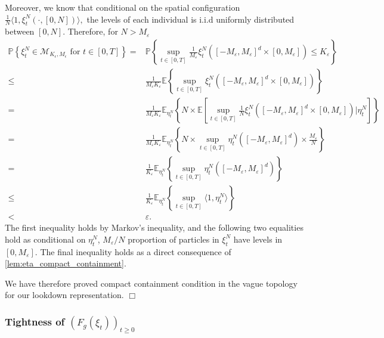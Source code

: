 \documentclass[12pt]{article}
\newenvironment {proof}{{\noindent\bf Proof }}{\hfill $\Box$ \medskip}
\begin{document}
\begin{proof}
Moreover, we know that conditional on the spatial configuration 
$\frac{1}{N}\langle 1, \xi^{N}_t(\cdot , [0, N]) \rangle,$
the levels of each individual
is i.i.d uniformly distributed between $[0,N]$. 
Therefore, for $N>M_{\varepsilon}$
\begin{align*}
     \mathbb{P}\left\{ \xi^{N}_t \in \mathcal{M}_{K_{\epsilon},M_{\epsilon}}
        \text{ for } t\in [0,T] \right\}
        =& \mathbb{P}\left\{\sup_{ t\in [0,T]} \frac{1}{M_\varepsilon} \xi^{N}_t([-M_\varepsilon,M_\varepsilon]^d \times [0,M_\varepsilon]) \leq K_\varepsilon
         \right\}\\
         \leq& \frac{1}{M_\varepsilon K_{\varepsilon}} \mathbb{E}\left\{\sup_{ t\in [0,T]}  \xi^{N}_t([-M_\varepsilon,M_\varepsilon]^d \times [0,M_\varepsilon]) \right\}\\
        =& \frac{1}{M_\varepsilon K_{\varepsilon}}             \mathbb{E}_{\eta^N_t}\left\{ N \times
            \mathbb{E}\left[  
                \sup_{ t\in [0,T]}  \frac{1}{N}\xi^{N}_t([-M_\varepsilon,M_\varepsilon]^d \times [0,M_\varepsilon])
                \bigg| \eta^N_t
                        \right]
                    \right\}\\
        =& \frac{1}{M_\varepsilon K_{\varepsilon}} \mathbb{E}_{\eta^N_t}
                    \left\{ N \times
                    \sup_{ t\in [0,T]} \eta^{N}_t([-M_\varepsilon,M_\varepsilon]^d) \times \frac{M_{\varepsilon}}{N}
                    \right\}\\
        =& \frac{1}{K_{\varepsilon}} \mathbb{E}_{\eta^N_t}
                    \left\{
                    \sup_{ t\in [0,T]} \eta^{N}_t([-M_\varepsilon,M_\varepsilon]^d) 
                    \right\}\\
        \leq & \frac{1}{K_{\varepsilon}} \mathbb{E}_{\eta^N_t}
                    \left\{
                    \sup_{ t\in [0,T]} \langle 1, \eta^{N}_t \rangle 
                    \right\}\\
        < & \varepsilon.
\end{align*}
The first inequality holds by Markov's inequality, and the following two equalities hold as 
conditional on $\eta^N_t$,
$M_{\varepsilon}/N$ proportion of particles in $\xi^N_t$ have levels in $[0,M_{\varepsilon}]$. The final inequality holds as a direct consequence of \ref{lem:eta_compact_containment}. 

We have therefore proved compact containment condition in the vague topology for our lookdown representation.
\end{proof}
\subsubsection{Tightness of $(F_g(\xi_t))_{t \geq 0}$}
\end{document}
